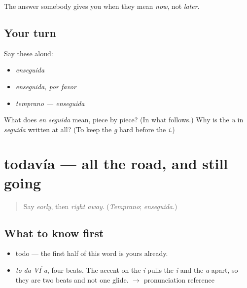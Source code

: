 \begin{grammarlens}[title={What you've built}]
The answer somebody gives you when they mean \emph{now}, not \emph{later}.
\end{grammarlens}

\subsection*{Your turn}
Say these aloud:

\begin{itemize}
\raggedright
  \item \emph{enseguida}
  \item \emph{enseguida, por favor}
  \item \emph{temprano — enseguida}
\end{itemize}

\begin{tcolorbox}[breakable,colback=teal!4,colframe=teal!35!black,title={Before you move on}]
What does \emph{en seguida} mean, piece by piece? (In what follows.) Why is the \emph{u} in \emph{seguida} written at all? (To keep the \emph{g} hard before the \emph{i}.)
\end{tcolorbox}
\section[todavía]{todavía — all the road, and still going}

\label{lesson:ES-C322-todavia}



\begin{quote}
Say \emph{early}, then \emph{right away}. (\emph{Temprano}; \emph{enseguida}.)
\end{quote}

\subsection*{What to know first}
\begin{itemize}
\raggedright
  \item todo — the first half of this word is yours already.
\end{itemize}

\begin{sounds}
\begin{itemize}
\raggedright
  \item \emph{to-da-VÍ-a}, four beats. The accent on the \emph{í} pulls the \emph{i} and the \emph{a} apart, so they are two beats and not one glide. $\to$ pronunciation reference
\end{itemize}
\end{sounds}

